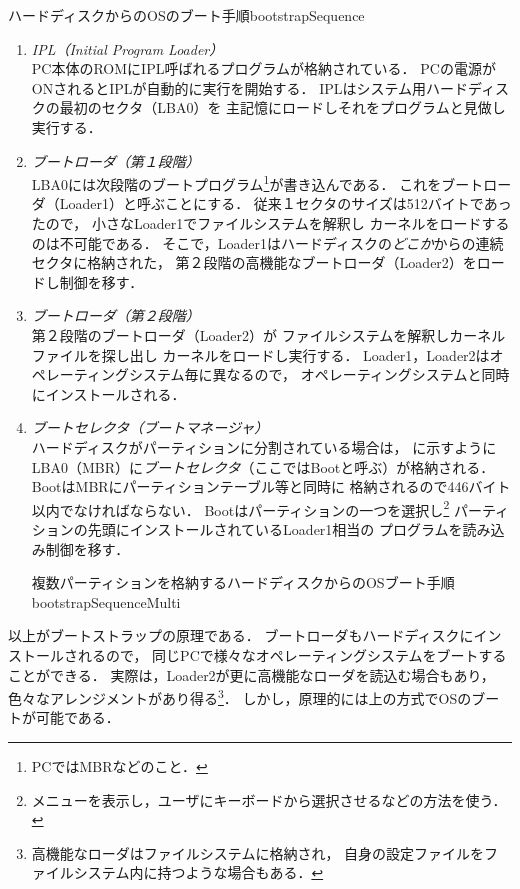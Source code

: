            {ハードディスクからのOSのブート手順}{bootstrapSequence}

\begin{enumerate}
\item \emph{IPL（Initial Program Loader）} \\
  PC本体のROMにIPL呼ばれるプログラムが格納されている．
  PCの電源がONされるとIPLが自動的に実行を開始する．
  IPLはシステム用ハードディスクの最初のセクタ（LBA0）を
  主記憶にロードしそれをプログラムと見做し実行する．
\item \emph{ブートローダ（第１段階）} \\
  LBA0には次段階のブートプログラム\footnote{
    PCではMBRなどのこと．}が書き込んである．
  これをブートローダ（Loader1）と呼ぶことにする．
  従来１セクタのサイズは512バイトであったので，
  小さなLoader1でファイルシステムを解釈し
  カーネルをロードするのは不可能である．
  そこで，Loader1はハードディスクの\emph{どこか}からの連続セクタに格納された，
  第２段階の高機能なブートローダ（Loader2）をロードし制御を移す．
\item \emph{ブートローダ（第２段階）} \\
  第２段階のブートローダ（Loader2）が
  ファイルシステムを解釈しカーネルファイルを探し出し
  カーネルをロードし実行する．
  Loader1，Loader2はオペレーティングシステム毎に異なるので，
  オペレーティングシステムと同時にインストールされる．
\item  \emph{ブートセレクタ（ブートマネージャ）} \\
  ハードディスクがパーティションに分割されている場合は，
  に示すように
  LBA0（MBR）に\emph{ブートセレクタ}（ここではBootと呼ぶ）が格納される．
  BootはMBRにパーティションテーブル等と同時に
  格納されるので446バイト以内でなければならない．
  Bootはパーティションの一つを選択し\footnote{
    メニューを表示し，ユーザにキーボードから選択させるなどの方法を使う．}
  パーティションの先頭にインストールされているLoader1相当の
  プログラムを読み込み制御を移す．

           {複数パーティションを格納するハードディスクからのOSブート手順}
           {bootstrapSequenceMulti}

\end{enumerate}

以上がブートストラップの原理である．
ブートローダもハードディスクにインストールされるので，
同じPCで様々なオペレーティングシステムをブートすることができる．
実際は，Loader2が更に高機能なローダを読込む場合もあり，
色々なアレンジメントがあり得る\footnote{
高機能なローダはファイルシステムに格納され，
自身の設定ファイルをファイルシステム内に持つような場合もある．}．
しかし，原理的には上の方式でOSのブートが可能である．

